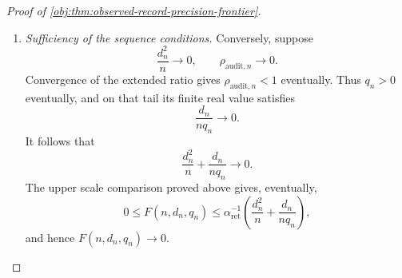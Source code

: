 \begin{proof}[Proof of \cref{obj:thm:observed-record-precision-frontier}]
\begin{enumerate}
For the lower truncated comparison, if \(d^2/(np)\ge1\), then
\[
\frac12\min\left\{1,\frac{d^2}{n}+\frac{d}{nq}\right\}
\le1=F(n,d,q).
\]
If \(d^2/(np)<1\), then
\[
\frac12\min\left\{1,\frac{d^2}{n}+\frac{d}{nq}\right\}
\le\frac12\left(\frac{d^2}{n}+\frac{d}{nq}\right)
\le\frac{d^2}{np}
=F(n,d,q).
\]
For the upper comparison, \(0<\alpha_{\mathrm{ret}}<1\) gives both
\[
\alpha_{\mathrm{ret}}F(n,d,q)\le1,
\qquad
\alpha_{\mathrm{ret}}F(n,d,q)
\le\alpha_{\mathrm{ret}}\frac{d^2}{np}
\le\frac{d^2}{n}+\frac{d}{nq}.
\]
Combining these inequalities proves
\[
\frac12\min\left\{1,\frac{d^2}{n}+\frac{d}{nq}\right\}
\le F(n,d,q)
\le
\alpha_{\mathrm{ret}}^{-1}
\min\left\{1,\frac{d^2}{n}+\frac{d}{nq}\right\}.
\]

Since \(F(n,d_n,q_n)\to0\), eventually
\[
F(n,d_n,q_n)<\frac12.
\]
The zero-retention identity then forces \(q_n>0\) eventually. On that tail,
the lower comparison implies
\[
\frac{d_n^2}{n}+\frac{d_n}{nq_n}<1:
\]
otherwise its truncated value would be \(1\), forcing
\(F(n,d_n,q_n)\ge1/2\). Removing the truncation now yields
\[
0\le\frac{d_n^2}{n}
\le\frac{d_n^2}{n}+\frac{d_n}{nq_n}
\le2F(n,d_n,q_n),
\]
and
\[
0\le\frac{d_n}{nq_n}
\le\frac{d_n^2}{n}+\frac{d_n}{nq_n}
\le2F(n,d_n,q_n).
\]
Both real ratios therefore tend to zero.

Define the extended audit ratio for every \(n\ge4\) by
\[
\rho_{\mathrm{audit},n}
=
\begin{cases}
+\infty,&q_n=0,\\[2pt]
\dfrac{d_n}{nq_n},&q_n>0.
\end{cases}
\]
It agrees eventually with the second real ratio, so
\[
\frac{d_n^2}{n}\longrightarrow0,
\qquad
\rho_{\mathrm{audit},n}\longrightarrow0.
\]

\item \textit{Sufficiency of the sequence conditions.}
Conversely, suppose
\[
\frac{d_n^2}{n}\longrightarrow0,
\qquad
\rho_{\mathrm{audit},n}\longrightarrow0.
\]
Convergence of the extended ratio gives
\(\rho_{\mathrm{audit},n}<1\) eventually. Thus \(q_n>0\) eventually,
and on that tail its finite real value satisfies
\[
\frac{d_n}{nq_n}\longrightarrow0.
\]
It follows that
\[
\frac{d_n^2}{n}+\frac{d_n}{nq_n}\longrightarrow0.
\]
The upper scale comparison proved above gives, eventually,
\[
0\le F(n,d_n,q_n)
\le\alpha_{\mathrm{ret}}^{-1}
\left(\frac{d_n^2}{n}+\frac{d_n}{nq_n}\right),
\]
and hence \(F(n,d_n,q_n)\to0\).


\end{enumerate}
\end{proof}
